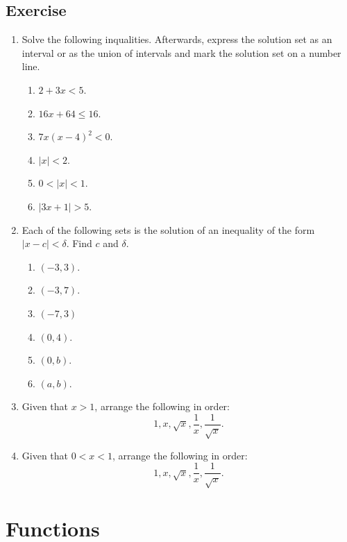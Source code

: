 \documentclass[11pt]{book}
\theoremstyle{break}
\theoremstyle{no_label}
\numberwithin{equation}{section}
\begin{document}
\subsection*{Exercise}
\begin{enumerate}[label=\arabic*.]
    \item Solve the following inqualities. Afterwards, express the solution set as an interval or as the union of intervals and mark the solution set on a number line.
    \begin{multicols}{3}
        \begin{enumerate}
            \item $2+3x<5$.
            \item $16x+64\leq16$.
            \item $7x(x-4)^2<0$.
            \item $|x|<2$.
            \item $0<|x|<1$.
            \item $|3x+1|>5$.
        \end{enumerate}
    \end{multicols}
    \item Each of the following sets is the solution of an inequality of the form $|x-c|<\delta$. Find $c$ and $\delta$.
    \begin{multicols}{3}
        \begin{enumerate}
            \item $(-3, 3)$.
            \item $(-3, 7)$.
            \item $(-7, 3)$
            \item $(0, 4)$.
            \item $(0, b)$.
            \item $(a, b)$.
        \end{enumerate}
    \end{multicols}
    \item Given that $x>1$, arrange the following in order: $$1, x, \sqrt{x}, \dfrac{1}{x}, \dfrac{1}{\sqrt{x}}.$$
    \item Given that $0<x<1$, arrange the following in order: $$1, x, \sqrt{x}, \dfrac{1}{x}, \dfrac{1}{\sqrt{x}}.$$
\end{enumerate}

\section{Functions}
\end{document}
